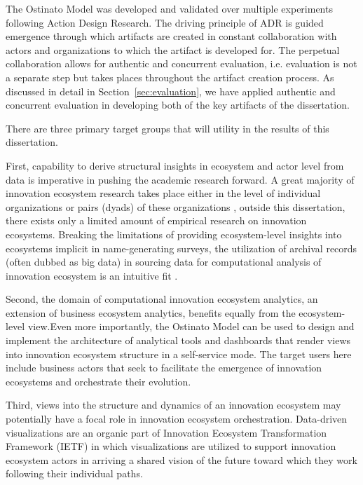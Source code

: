 The Ostinato Model was developed and validated over multiple experiments following Action Design Research. The driving principle of ADR is guided emergence through which artifacts are created in constant collaboration with actors and organizations to which the artifact is developed for. The perpetual collaboration allows for authentic and concurrent evaluation, i.e. evaluation is not a separate step but takes places throughout the artifact creation process. As discussed in detail in Section~\ref{sec:evaluation}, we have applied authentic and concurrent evaluation in developing both of the key artifacts of the dissertation.

There are three primary target groups that will utility in the results of this dissertation.

First, capability to derive structural insights in ecosystem and actor level from data is imperative in pushing the academic research forward. A great majority of innovation ecosystem research takes place either in the level of individual organizations or pairs (dyads) of these organizations \citep{Jarvi2016TakingReview}, outside this dissertation, there exists only a limited amount of empirical research on innovation ecosystems. Breaking the limitations of providing ecosystem-level insights into ecosystems implicit in name-generating surveys, the utilization of archival records (often dubbed as big data) in sourcing data for computational analysis of innovation ecosystem is an intuitive fit \citep[cf.][]{Williams2015MixedAnalysis}.

Second, the domain of computational innovation ecosystem analytics, an extension of business ecosystem analytics, benefits equally from the ecosystem-level view.Even more importantly, the Ostinato Model can be used to design and implement the architecture of analytical tools and dashboards that render views into innovation ecosystem structure in a self-service mode. The target users here include business actors that seek to facilitate the emergence of innovation ecosystems and orchestrate their evolution. 

Third, views into the structure and dynamics of an innovation ecosystem may potentially have a focal role in innovation ecosystem orchestration. Data-driven visualizations are an organic part of Innovation Ecosystem Transformation Framework (IETF) in which visualizations are utilized to support innovation ecosystem actors in arriving a shared vision of the future toward which they work following their individual paths. 

